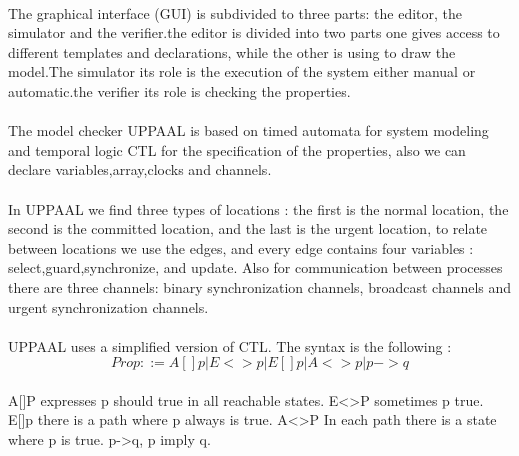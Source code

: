\documentclass[10pt,a4paper]{article}
\begin{document}
\paragraph{}
The graphical interface (GUI) is subdivided to three parts: the editor, the simulator and the verifier.the editor is divided into two parts one gives access to different templates and declarations, while the other is using to draw the model.The simulator its role is the execution of the system either manual or automatic.the verifier its role is checking the properties.
\paragraph{}
The model checker UPPAAL is based on timed automata for system modeling and temporal logic CTL for the specification of the properties, also we can declare variables,array,clocks and channels.
\paragraph{}
In UPPAAL we find three types of locations : the first is the normal location, the second is the committed location, and the last is the urgent location, to relate  between locations we use the edges, and every edge contains four variables : select,guard,synchronize, and update. Also for communication between processes there are three channels: binary synchronization channels, broadcast channels and urgent synchronization channels.
\paragraph{}
UPPAAL uses a simplified version of CTL. The syntax is the following :
\[Prop::=A[]p | E<>p | E[]p | A<>p | p->q\]
\paragraph{}					
A[]P expresses p should true in all reachable states. E<>P sometimes p true. E[]p there is a path where p always is true. A<>P In each path there is a state where p is true. p->q, p imply q. 



\end{document}

